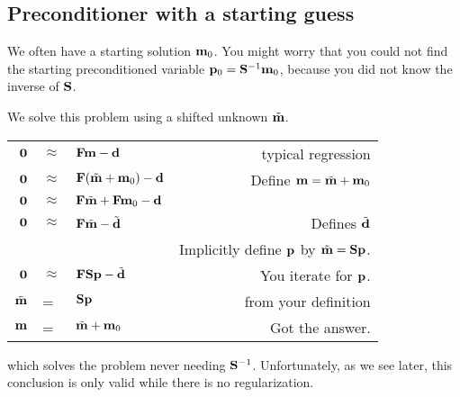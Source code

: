 \subsection{Preconditioner with a starting guess}
We often have a starting solution
$\bold m_0$.
You might worry that
you could not find the starting preconditioned variable 
$\bold p_0= \bold S^{-1}\bold m_0$,
because you did not know the inverse of $\bold S$.
\par
We solve this problem using a shifted unknown $\tilde {\bold m}$.
\par
\begin{center}
\begin{tabular}{rllr}
$\bold 0 $&$\approx$ & $\bold F\bold m -\bold d $     & typical regression
\\
$\bold 0 $&$\approx$ & $\bold F(\tilde{\bold m}+\bold m_0) -\bold d $  &
                                                        Define $\bold m =\tilde{\bold m}+\bold m_0$
\\
$\bold 0 $&$\approx$ & $\bold F\tilde{\bold m}+\bold F \bold m_0 -\bold d $  &
\\
$\bold 0 $&$\approx$ & $\bold F\tilde{\bold m}-\tilde {\bold d} $  & Defines $\tilde{\bold d}$
\\
        &          &               & Implicitly define $\bold p$ by $\tilde{\bold m}=\bold S\bold p$.
\\
$\bold 0 $&$\approx$ & $\bold F\bold S \bold p-\tilde {\bold d} $  & You iterate for $\bold p$.
\\
$\tilde{\bold m}$&=&$\bold S\bold p$  & from your definition
\\
$\bold m$ &=&$ \tilde{\bold m} + \bold m_0 $& Got the answer.
\end{tabular}
\end{center}
\par\noindent
which solves the problem never needing $\bold S^{-1}$.
Unfortunately, as we see later,
this conclusion is only valid while there is no regularization.

